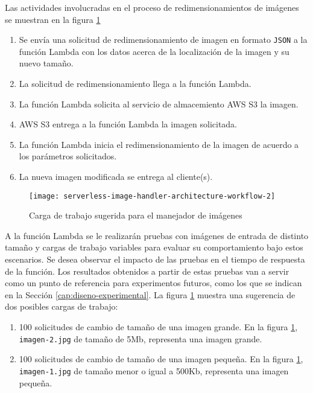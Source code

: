 Las actividades involucradas en el proceso de redimensionamientos de imágenes se muestran en la figura \ref{fig:serverless-image-handler-architecture-workflow}
\begin{enumerate}
    \item Se envía una solicitud de redimensionamiento de imagen en formato \texttt{JSON} a la función Lambda con los datos acerca de la localización de la imagen y su nuevo tamaño.
    \item La solicitud de redimensionamiento llega a la función Lambda.
    \item La función Lambda solicita al servicio de almacemiento AWS S3 la imagen.
    \item AWS S3 entrega a la función Lambda la imagen solicitada.
    \item La función Lambda inicia el redimensionamiento de la imagen de acuerdo a los parámetros solicitados.
    \item La nueva imagen modificada se entrega al cliente(s).
\end{enumerate}

\begin{figure}[h]
  \centering
  \texttt{[image: serverless-image-handler-architecture-workflow-2]}
  \caption[Carga de trabajo sugerida para el manejador de imágenes]{Carga de trabajo sugerida para el manejador de imágenes}
  \label{fig:serverless-image-handler-architecture-workflow}
\end{figure}


A la función Lambda se le realizarán pruebas con imágenes de entrada de distinto tamaño y cargas de trabajo variables para evaluar su comportamiento bajo estos escenarios. Se desea observar el impacto de las pruebas en el tiempo de respuesta de la función. Los resultados obtenidos a partir de estas pruebas van a servir como un punto de referencia para experimentos futuros, como los que se indican en la Sección \ref{cap:diseno-experimental}. La figura \ref{fig:serverless-image-handler-architecture-workflow} muestra una sugerencia de dos posibles cargas de trabajo: 

\begin{enumerate}
    \item 100 solicitudes de cambio de tamaño de una imagen grande. En la figura \ref{fig:serverless-image-handler-architecture-workflow}, \texttt{imagen-2.jpg} de tamaño de 5Mb, representa una imagen grande.
    \item 100 solicitudes de cambio de tamaño de una imagen pequeña. En la figura \ref{fig:serverless-image-handler-architecture-workflow}, \texttt{imagen-1.jpg} de tamaño menor o igual a 500Kb, representa una imagen pequeña.
\end{enumerate}

